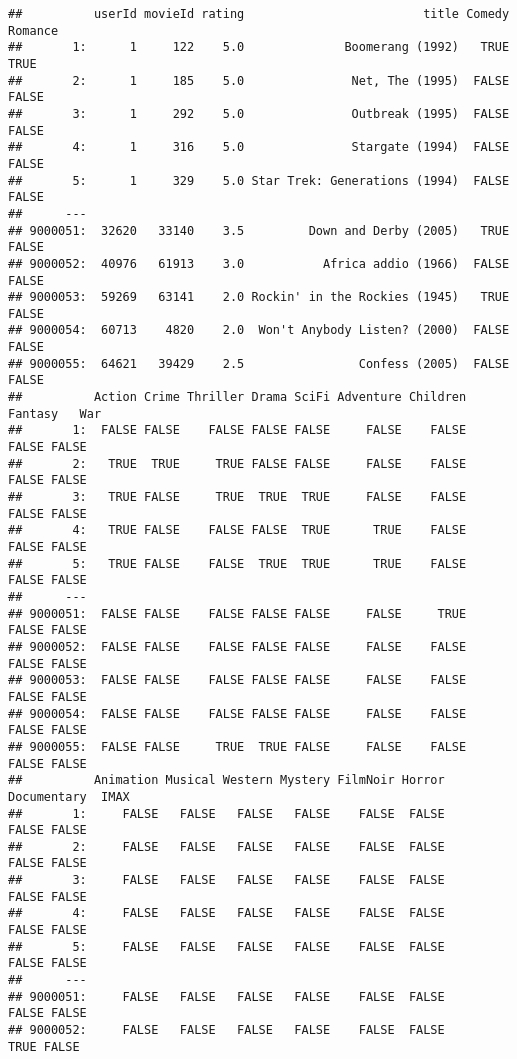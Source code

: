 \documentclass[
]{article}
\begin{document}
\begin{verbatim}
##          userId movieId rating                         title Comedy Romance
##       1:      1     122    5.0              Boomerang (1992)   TRUE    TRUE
##       2:      1     185    5.0               Net, The (1995)  FALSE   FALSE
##       3:      1     292    5.0               Outbreak (1995)  FALSE   FALSE
##       4:      1     316    5.0               Stargate (1994)  FALSE   FALSE
##       5:      1     329    5.0 Star Trek: Generations (1994)  FALSE   FALSE
##      ---                                                                   
## 9000051:  32620   33140    3.5         Down and Derby (2005)   TRUE   FALSE
## 9000052:  40976   61913    3.0           Africa addio (1966)  FALSE   FALSE
## 9000053:  59269   63141    2.0 Rockin' in the Rockies (1945)   TRUE   FALSE
## 9000054:  60713    4820    2.0  Won't Anybody Listen? (2000)  FALSE   FALSE
## 9000055:  64621   39429    2.5                Confess (2005)  FALSE   FALSE
##          Action Crime Thriller Drama SciFi Adventure Children Fantasy   War
##       1:  FALSE FALSE    FALSE FALSE FALSE     FALSE    FALSE   FALSE FALSE
##       2:   TRUE  TRUE     TRUE FALSE FALSE     FALSE    FALSE   FALSE FALSE
##       3:   TRUE FALSE     TRUE  TRUE  TRUE     FALSE    FALSE   FALSE FALSE
##       4:   TRUE FALSE    FALSE FALSE  TRUE      TRUE    FALSE   FALSE FALSE
##       5:   TRUE FALSE    FALSE  TRUE  TRUE      TRUE    FALSE   FALSE FALSE
##      ---                                                                   
## 9000051:  FALSE FALSE    FALSE FALSE FALSE     FALSE     TRUE   FALSE FALSE
## 9000052:  FALSE FALSE    FALSE FALSE FALSE     FALSE    FALSE   FALSE FALSE
## 9000053:  FALSE FALSE    FALSE FALSE FALSE     FALSE    FALSE   FALSE FALSE
## 9000054:  FALSE FALSE    FALSE FALSE FALSE     FALSE    FALSE   FALSE FALSE
## 9000055:  FALSE FALSE     TRUE  TRUE FALSE     FALSE    FALSE   FALSE FALSE
##          Animation Musical Western Mystery FilmNoir Horror Documentary  IMAX
##       1:     FALSE   FALSE   FALSE   FALSE    FALSE  FALSE       FALSE FALSE
##       2:     FALSE   FALSE   FALSE   FALSE    FALSE  FALSE       FALSE FALSE
##       3:     FALSE   FALSE   FALSE   FALSE    FALSE  FALSE       FALSE FALSE
##       4:     FALSE   FALSE   FALSE   FALSE    FALSE  FALSE       FALSE FALSE
##       5:     FALSE   FALSE   FALSE   FALSE    FALSE  FALSE       FALSE FALSE
##      ---                                                                    
## 9000051:     FALSE   FALSE   FALSE   FALSE    FALSE  FALSE       FALSE FALSE
## 9000052:     FALSE   FALSE   FALSE   FALSE    FALSE  FALSE        TRUE FALSE

\end{verbatim}
\end{document}
